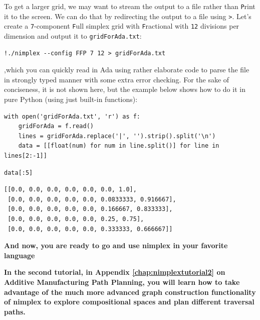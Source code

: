 To get a larger grid, we may want to stream the output to a file rather
than \texttt{P}rint it to the screen. We can do that by
redirecting the output to a file using \texttt{>}.
Let's create a \texttt{7}-component
\texttt{F}ull simplex grid with
\texttt{F}ractional with \texttt{12}
divisions per dimension and output it to
\texttt{gridForAda.txt}:

\begin{verbatim}
!./nimplex --config FFP 7 12 > gridForAda.txt
\end{verbatim}

,which you can quickly read in Ada using rather elaborate code to parse
the file in strongly typed manner with some extra error checking. For
the sake of conciseness, it is not shown here, but the example below
shows how to do it in pure Python (using just built-in functions):

\begin{verbatim}
with open('gridForAda.txt', 'r') as f:
    gridForAda = f.read()
    lines = gridForAda.replace('|', '').strip().split('\n')
    data = [[float(num) for num in line.split()] for line in lines[2:-1]]
\end{verbatim}

\begin{verbatim}
data[:5]
\end{verbatim}

\begin{verbatim}
[[0.0, 0.0, 0.0, 0.0, 0.0, 0.0, 1.0],
 [0.0, 0.0, 0.0, 0.0, 0.0, 0.0833333, 0.916667],
 [0.0, 0.0, 0.0, 0.0, 0.0, 0.166667, 0.833333],
 [0.0, 0.0, 0.0, 0.0, 0.0, 0.25, 0.75],
 [0.0, 0.0, 0.0, 0.0, 0.0, 0.333333, 0.666667]]
\end{verbatim}

\textbf{And now, you are ready to go and use nimplex in your favorite
language}

\textbf{In the second tutorial, in Appendix \ref{chap:nimplextutorial2} on 
Additive Manufacturing Path Planning, you will learn how to take advantage of the much more advanced graph construction functionality of nimplex to explore compositional spaces
and plan different traversal paths.}


